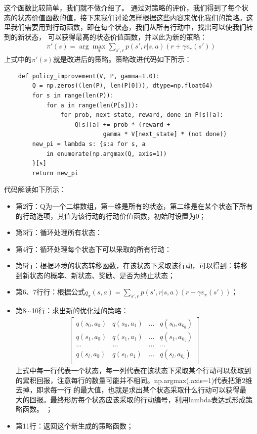 这个函数比较简单，我们就不做介绍了。
通过对策略的评价，我们得到了每个状态的状态价值函数的值，接下来我们讨论怎样根据这些内容来优化我们的策略。这里我们需要用到行动函数，即在每个状态，我们从所有行动中，找出可以使我们转到的新状态，
可以获得最高的状态价值函数，并以此为新的策略：
\begin{equation}
\begin{aligned}
& \pi ' (s) = \arg \max_{a} \sum_{s',r} p(s', r | s, a)(r + \gamma v_{\pi}(s'))
\end{aligned}
\label{a-v-f-p-e-swf-demo}
\end{equation}
上式中的$\pi '(s)$就是改进后的策略。策略改进代码如下所示：
\begin{lstlisting}
    def policy_improvement(V, P, gamma=1.0):
        Q = np.zeros((len(P), len(P[0])), dtype=np.float64)
        for s in range(len(P)):
            for a in range(len(P[s])):
                for prob, next_state, reward, done in P[s][a]:
                    Q[s][a] += prob * (reward + 
                            gamma * V[next_state] * (not done))
        new_pi = lambda s: {s:a for s, a 
            in enumerate(np.argmax(Q, axis=1))
        }[s]
        return new_pi
\end{lstlisting}
代码解读如下所示：
\begin{itemize}
    \item 第2行：Q为一个二维数组，第一维是所有的状态，第二维是在某个状态下所有的行动选项，其值为该行动的行动价值函数，初始时设置为0；
    \item 第3行：循环处理所有状态：
    \item 第4行：循环处理每个状态下可以采取的所有行动：
    \item 第5行：根据环境的状态转移函数，在该状态下采取该行动，可以得到：转移到新状态的概率、新状态、奖励、是否为终止状态；
    \item 第6、7行行：根据公式$q_{\pi}(s, a)=\sum_{s',r} p(s', r|s, a)(r+\gamma v_{\pi}(s'))$；
    \item 第8$\sim$10行：求出新的优化过的策略：
\begin{equation}
\begin{aligned}
    \begin{bmatrix}
        q(s_{0}, a_{0}) & q(s_{0}, a_{1}) & ... & q(s_{0}, a_{k_{0}}) \\
        q(s_{1}, a_{0}) & q(s_{1}, a_{1}) & ... & q(s_{1}, a_{k_{1}}) \\
        ... & ... & ... & ... \\
        q(s_{l}, a_{0}) & q(s_{l}, a_{1}) & ... & q(s_{l}, a_{k_{l}}) \\
    \end{bmatrix}
\end{aligned}
\label{chp001-policy-improvement1}
\end{equation}
上式中每一行代表一个状态，每一列代表在该状态下采取某个行动可以获取到的累积回报，注意每行的数量可能并不相同。np.argmax(,axis=1)代表把第2维去掉，即求每一行
的最大值，也就是求出某个状态采取什么行动可以获得最大的回报。最终形厉每个状态应该采取的行动编号，利用lambda表达式形成策略函数。
    ；
    \item 第11行：返回这个新生成的策略函数；
\end{itemize}
